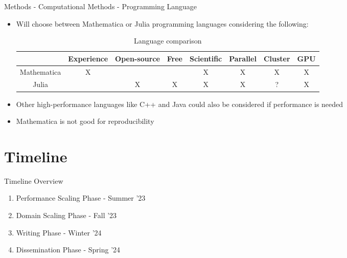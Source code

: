 \documentclass[aspectratio=169]{beamer}
\begin{document}
        \begin{frame}{Methods - Computational Methods - Programming Language}
            \vspace{-0.15in}
            \begin{itemize}
                \item Will choose between Mathematica or Julia programming languages considering the following:
                \begin{table}[c|c|c|c|c|c|c|c]
                    \centering
                    \hspace{-0.5in}
                    \begin{tabular}{c|c|c|c|c|c|c|c}
                                    & Experience & Open-source & Free & Scientific & Parallel & Cluster & GPU \\
                        \hline
                        Mathematica & X          &             &      & X          & X        & X       & X \\
                        \hline
                        Julia       &            & X           & X    & X          & X        & ?       & X
                    \end{tabular}
                    \caption{Language comparison}
                \end{table}
                \vspace{-0.25in}
                \item Other high-performance languages like C++ and Java could also be considered if performance is needed
                \item Mathematica is not good for reproducibility
            \end{itemize}
        \end{frame}

\section{Timeline}

    \begin{frame}{Timeline Overview}
        \begin{enumerate}
            \item Performance Scaling Phase - Summer '23 
            \item Domain Scaling Phase - Fall '23
            \item Writing Phase - Winter '24 
            \item Dissemination Phase - Spring '24
        \end{enumerate}
    \end{frame}
\end{document}

